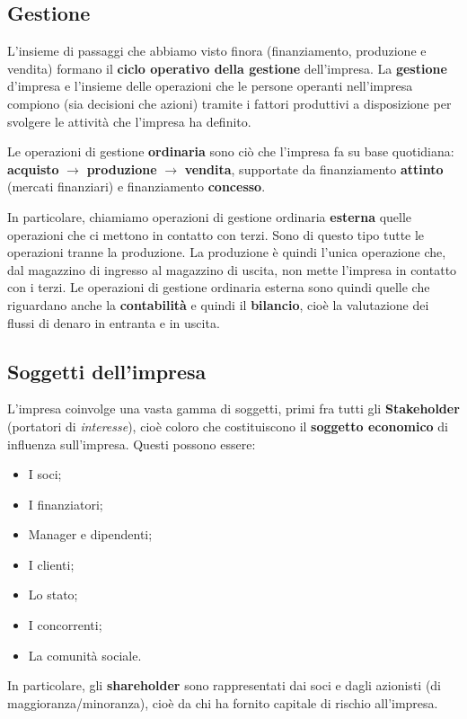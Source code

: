 \documentclass[a4paper,11pt]{article}
\begin{document}
\subsection{Gestione}
L'insieme di passaggi che abbiamo visto finora (finanziamento, produzione e vendita) formano il \textbf{ciclo operativo della gestione} dell'impresa.
La \textbf{gestione} d'impresa e l'insieme delle operazioni che le persone operanti nell'impresa compiono (sia decisioni che azioni) tramite i fattori produttivi a disposizione per svolgere le attività che l'impresa ha definito.

Le operazioni di gestione \textbf{ordinaria} sono ciò che l'impresa fa su base quotidiana: \textbf{acquisto} $\rightarrow$ \textbf{produzione} $\rightarrow$ \textbf{vendita}, supportate da finanziamento \textbf{attinto} (mercati finanziari) e finanziamento \textbf{concesso}.

In particolare, chiamiamo operazioni di gestione ordinaria \textbf{esterna} quelle operazioni che ci mettono in contatto con terzi.
Sono di questo tipo tutte le operazioni tranne la produzione.
La produzione è quindi l'unica operazione che, dal magazzino di ingresso al magazzino di uscita, non mette l'impresa in contatto con i terzi.
Le operazioni di gestione ordinaria esterna sono quindi quelle che riguardano anche la \textbf{contabilità} e quindi il \textbf{bilancio}, cioè la valutazione dei flussi di denaro in entranta e in uscita.

\subsection{Soggetti dell'impresa}
L'impresa coinvolge una vasta gamma di soggetti, primi fra tutti gli \textbf{Stakeholder} (portatori di \textit{interesse}), cioè coloro che costituiscono il \textbf{soggetto economico} di influenza sull'impresa.
Questi possono essere:
\begin{itemize}
	\item I soci;
	\item I finanziatori;
	\item Manager e dipendenti;
	\item I clienti;
	\item Lo stato;
	\item I concorrenti;
	\item La comunità sociale.
\end{itemize}

In particolare, gli \textbf{shareholder} sono rappresentati dai soci e dagli azionisti (di maggioranza/minoranza), cioè da chi ha fornito capitale di rischio all'impresa.
\end{document}
